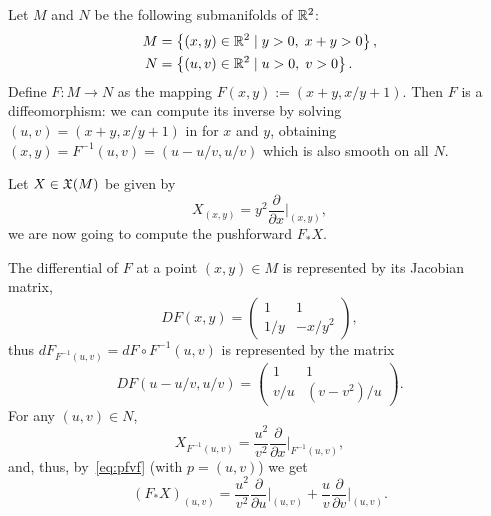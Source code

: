 \begin{example}
	Let $M$ and $N$ be the following submanifolds of $\mathbb{R}^2$:
	\begin{align}
		M & = \left\{(x,y)\in\mathbb{R}^2 \mid y>0,\; x+y>0\right\}, \\
		N & = \left\{(u,v)\in\mathbb{R}^2 \mid u>0,\; v>0 \right\}.
	\end{align}
	Define $F:M\to N$ as the mapping $F(x,y):=(x+y, x/y+1)$.
	Then $F$ is a diffeomorphism: we can compute its inverse by solving $(u,v)=(x+y, x/y+1)$ in for $x$ and $y$, obtaining $(x,y)=F^{-1}(u,v)=(u-u/v, u/v)$ which is also smooth on all $N$.

	Let $X\in\mathfrak{X}(M)$ be given by
	\begin{equation}
		X_{(x,y)} = y^2\frac{\partial}{\partial x}\Big|_{(x,y)},
	\end{equation}
	we are now going to compute the pushforward $F_* X$.

	The differential of $F$ at a point $(x,y)\in M$ is represented by its Jacobian matrix,
	\begin{equation}
		DF(x,y) = \begin{pmatrix}
			1   & 1      \\
			1/y & -x/y^2
		\end{pmatrix},
	\end{equation}
	thus $dF_{F^{-1}(u,v)} = dF\circ F^{-1}(u,v)$ is represented by the matrix
	\begin{equation}
		DF(u-u/v, u/v) = \begin{pmatrix}
			1   & 1         \\
			v/u & (v-v^2)/u
		\end{pmatrix}.
	\end{equation}
	For any $(u,v)\in N$,
	\begin{equation}
		X_{F^{-1}(u,v)} = \frac{u^2}{v^2}\frac{\partial}{\partial x}\Big|_{F^{-1}(u,v)},
	\end{equation}
	and, thus, by~\eqref{eq:pfvf} (with $p=(u,v)$) we get
	\begin{equation}
		(F_*X)_{(u,v)} = \frac{u^2}{v^2}\frac{\partial}{\partial u}\Big|_{(u,v)} + \frac{u}{v}\frac{\partial}{\partial v}\Big|_{(u,v)}.
	\end{equation}
\end{example}

